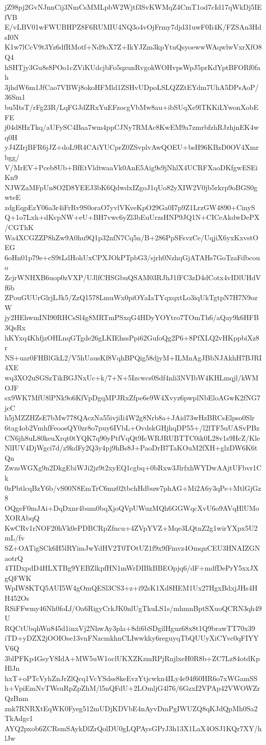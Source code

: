 jZ98pj2GvNJnnCij3NmCsMMLpbW2Wjtf3SvKWMqZ4CmT1od7cId17qWkDj5IEfVB
E/vLBV01wFWUBHPZ8F6RUMIU4NQ3o4vOjFrmy7djd31uwF0Ii4K/FZSAn3HdsI0N
K1w7lCcV9t3Yz6dfRMotf+Nd9oX7Z+IkYJZm3kpYtuQsyoewwWAqwlwVxrXfO8Q4
hSHTjy3Gu8s8POo1cZViKUdcjbFo5qzunRvgokWOHvpsWpJ5prKdYptBFORf0fah
3jhdW6m1JfCao7VBWj8okoHFMld1ZSHvUDpoLSLQZZtEYdm7UhA5DPsAoP/36Sm1
bu5ItsT/rFg23R/LqFGJdZRxYuEFzocgVbMw8au+ibSUqXe9lTKKiLYwonXobEFE
j04d8HzTkq/aUFySC4Baa7wm4ppCJNy7RMAc8KwEM9a7zmrbfzhRJzhjnEK4wq0H
yJ4ZIrjBFR6jJZ+doL9R4CAiYUCprZ0ZSvplvAwQOEU+bsH96KBzD0OV4Xmrbgg/
V/MrEV+Pceb8Ub+BfEtVldtwaaVk0AnE5Aig9s9jNhlX4UCRFXaoDKfgwESEiKn9
NJWZaMFpUn8O2D8YEEJ3bK6QdwdxIZgoJ1qUo82yXIW2V0jb5rkrp9oBGS0gwteE
zdgEqpEzY06a3r4iFrRv9S0oraO7yvlVKveKpO29Ga0I7p9Z1LrzGW4890+CinyS
Q+1o7Lxh+dKvpNW+eU+BH7vwc6yZl3bEuUrzsHNP9JQ1N+CICeAkdwDePX/CGThK
Wa4XCGZZP8hZw9A0hu9Q1p32nfN7Cq5n/B+286PpSFsvzCe/UqjiX6yxKxvstOEG
6oHn01p79e+cS9tLdHohUxCPXJOkPTpbG3/sjrh0NzhqGjATAHs7GoTzaFdbcouo
ZcjrWNHXB6uop0zVXP/UJlfCHSGbuQSAM03RJhJ1fFC3zD4dCotx4vIDlUHdVf6b
ZPouGUUrGlrjLJk5/ZzQ1578LmuWx0piOYaIaTYqxqxtLo3iqUkTgtpN7H7N9ozW
jy2HEhwmINI90RHCsSl4g8MRTmPSxqG4HDyYOYtro7TOmTh6/aQay9k6HFB3QsRx
hKYxq4KhfjzOHLnqGTgde26gLKIEhssPpi62GufoQg2P6+8PfXLQ2vHKppbiXz8r
NS+uar0FHBlGkL2/V5hUausKf8VqhBPQig58djyM+ILMnAgJBbNJAkhH7BJRI4XE
wq3XO2uSGSzTikBGJNxUc+k/7+N+5Izcwcs0Sdf4nli3NVIbW4KHLmqjl/kWMOJF
sx9WK7MfU8lPNk9o6KfVpDgqMPJRxZfpe6e9W4Xvyz6pwplNbEloAGwK2fNG7jcC
h5jMZZHZsE7bMw778QAczNa55ivjiIi4W2g8Nrb8a+JAid73wHzBRCsElpso0Slr
6tag4ob2VmhfFeoosQY0zr8o7puy6IVbL+OvdskGHjhqDP55+/l2lTF5uUASvPBz
CN6jh8uL80keuXrqt0tYQK7q90yPtfVqQt9IcWRJRUBTTC0ik0L28v1s9HcZ/Kle
NlIUV4DjWgci7d/z9kdFy2Q3y4pj9hBs8J+PaoDrB7TaKOuM2fXH+glzDW6K6tQn
ZwzsWGXg9n2DkgEbiWJi2jz9t2xyEQ1cgbq+0bRxw3JlrfxhWYDwAAjtUFbvr1Ck
0zPbtlcqBzY6b/vS00N8EmTrC6mz02tbchHdbuw7phAG+Mi2A6y3qPe+MtlGjGz8
OQgeF0mJAi+DqDxnr4bum0bqXjoQVpUWuzMQh6GGWqcXvU6o9AVqHlUMoXORAbqQ
KwCRv1rNOF20hVk0ePDBCRpZfncu+4ZVpYVZ+Mqe3LQtnZ2g1wirYXpx5U2mL/fv
SZ+OATigSCk6H5lRYimJwYdHV2T0TOtUZ1f9x9fFmvz4OmqnCEU3HNAIZGNaotrQ
4TIDxpdD4HLXTBg9YEBZlkpfHN1mWrDIBkBBEOpjq6/dF+mdfDePrY5xxJXgQFWK
WpIW8KTQ5AUI5W4gOmQESl3CS3+z+i92sK1Xd8HEM1Ux27HgxBdxjJHs4HH452Os
RSiFFwmy46Nh0foLf/Oa6RigyCrkJK0nlUgTkuLS1s/mhmnBptSXuoQCRN3qh49U
RQCtUbqhWn845d1inxVj2NhwAy3pla+8di6bSDgilHguz68x8t1Q9brawTT70x39
iTD+yDZX2jOOIOse13vnFNzcmkhnCLIwwkky6reguyqTbQUUyXiCYvc0qFIYYV6Q
3blPFKp4GsyY8IdA+MW5uW1oclUKXZKzmRPjRnjlxeH0R8b+ZC7Lz84otdKpHlJn
hxT+oPTcVyhZnJrZlQcq1VcYSdss8keEvzYtjcwkn4ILy4e94f60HR6o7xWGamSS
h+VpiEmNvTWsuRpZpZhM/l5nQFdU+2LOmljG4l76/6GzxI2VPAp42VWOWZrQzBnm
znk7RNRXtEqWK0Fyeg512mUDjKDVbE4nAyvDmPgIWUZQ8qKJdQpMh0Sa2TkAdgc1
AYQ2pxob6ZCRsmSAykDlZrQolDU0gLQPAysGPrJ3h13X1LaX4OSJ1KQr7XY/hlJw
